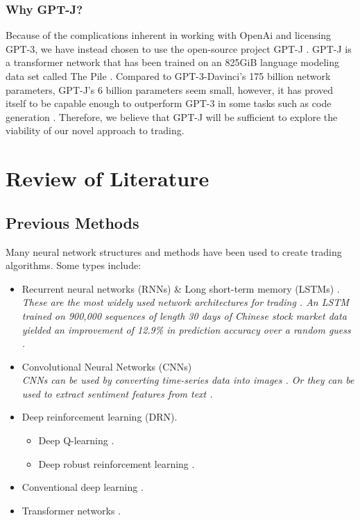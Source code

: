 \documentclass[conference]{IEEEtran}
\begin{document}
\subsubsection{Why GPT-J?}
Because of the complications inherent in working with OpenAi and licensing GPT-3, we have instead chosen to use the open-source project GPT-J \cite{mesh-transformer-jax}. GPT-J is a transformer network \cite{Vaswani2017} that has been trained on an 825GiB language modeling data set called The Pile \cite{Gao2021}. Compared to GPT-3-Davinci's 175 billion network parameters, GPT-J's 6 billion parameters seem small, however, it has proved itself to be capable enough to outperform GPT-3 in some tasks such as code generation \cite{forefront}. Therefore, we believe that GPT-J will be sufficient to explore the viability of our novel approach to trading.

\section{Review of Literature}
\subsection{Previous Methods}
Many neural network structures and methods have been used to create trading algorithms. Some types include: 
\begin{itemize}
    \item Recurrent neural networks (RNNs) \& Long short-term memory (LSTMs) \cite{Chen2017}\cite{Mehta2021}.
          \\\emph{These are the most widely used network architectures for trading \cite{Gu2020}. An LSTM trained on 900,000 sequences of length 30 days of Chinese stock market data yielded an improvement of 12.9\% in prediction accuracy over a random guess \cite{Chen2015}.}
    \item Convolutional Neural Networks (CNNs) \cite{Gu2020}
          \\\emph{CNNs can be used by converting time-series data into images \cite{Sezer2018}. Or they can be used to extract sentiment features from text \cite{Shi2020}.}
    \item Deep reinforcement learning (DRN).
          \begin{itemize}
            \item Deep Q-learning \cite{Wang2017} \cite{Nan2020}.
            \item Deep robust reinforcement learning \cite{Li2019}.
          \end{itemize}
    \item Conventional deep learning \cite{Day2016}.
    \item Transformer networks \cite{Schmitz2020}.
\end{itemize}
\end{document}
